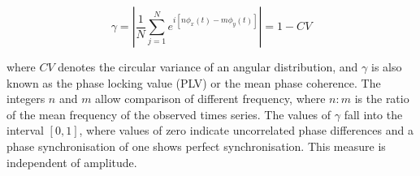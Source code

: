 \documentclass[]{article}
\begin{document}
\begin{equation}
\gamma = |\frac{1}{N}\sum_{j=1}^N e^{i[n\phi_x(t)-m\phi_y(t)]}| =
1-CV
\end{equation}

where $CV$ denotes the circular variance of an angular distribution,
and $\gamma$ is also known as the phase locking value (PLV) or the
mean phase coherence. The integers $n$ and $m$ allow comparison of
different frequency, where $n:m$ is the ratio of the mean frequency
of the observed times series. The values of $\gamma$ fall into the
interval $[0,1]$, where values of zero indicate uncorrelated phase
differences and a phase synchronisation of one shows perfect
synchronisation. This measure is independent of amplitude.\\

%
%








\end{document}
